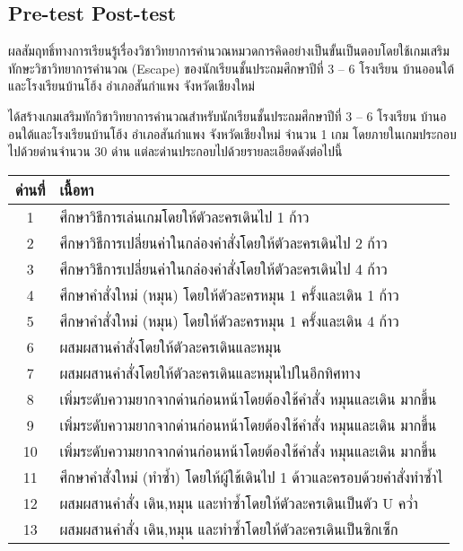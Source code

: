 \subsection{Pre-test Post-test}
ผลสัมฤทธิ์ทางการเรียนรู้เรื่องวิชาวิทยาการคำนวณหมวดการคิดอย่างเป็นขั้นเป็นตอบโดยใช้เกมเสริมทักษะวิชาวิทยาการคำนวณ (Escape) ของนักเรียนชั้นประถมศึกษาปีที่ 3 – 6
โรงเรียน บ้านออนใต้และโรงเรียนบ้านโฮ้ง อำเภอสันกำแพง จังหวัดเชียงใหม่\par
ได้สร้างเกมเสริมทักวิชาวิทยาการคำนวณสำหรับนักเรียนชั้นประถมศึกษาปีที่ 3 – 6 โรงเรียน
บ้านออนใต้และโรงเรียนบ้านโฮ้ง อำเภอสันกำแพง จังหวัดเชียงใหม่ จำนวน 1 เกม
โดยภายในเกมประกอบไปด้วยด่านจำนวน 30 ด่าน
แต่ละด่านประกอบไปด้วยรายละเอียดดังต่อไปนี้\par
{}
\begin{center}
    \begin{tabular}{|c | m{35em}|} 
     \hline
     ด่านที่ & เนื้อหา\\ [0.5ex] 
     \hline\hline
     1 &  ศึกษาวิธีการเล่นเกมโดยให้ตัวละครเดินไป 1 ก้าว \\ 
     \hline
     2 &  ศึกษาวิธีการเปลี่ยนค่าในกล่องคำสั่งโดยให้ตัวละครเดินไป 2 ก้าว \\ 
     \hline
     3 &  ศึกษาวิธีการเปลี่ยนค่าในกล่องคำสั่งโดยให้ตัวละครเดินไป 4 ก้าว \\ 
     \hline
     4 &  ศึกษาคำสั่งใหม่ (หมุน) โดยให้ตัวละครหมุน 1 ครั้งและเดิน 1 ก้าว \\ 
     \hline
     5 &  ศึกษาคำสั่งใหม่ (หมุน) โดยให้ตัวละครหมุน 1 ครั้งและเดิน 4 ก้าว \\ 
     \hline
     6 &  ผสมผสานคำสั่งโดยให้ตัวละครเดินและหมุน \\ 
     \hline
     7 &  ผสมผสานคำสั่งโดยให้ตัวละครเดินและหมุนไปในอีกทิศทาง \\ 
     \hline
     8 &  เพิ่มระดับความยากจากด่านก่อนหน้าโดยต้องใช้คำสั่ง หมุนและเดิน มากขึ้น \\ 
     \hline
     9 &  เพิ่มระดับความยากจากด่านก่อนหน้าโดยต้องใช้คำสั่ง หมุนและเดิน มากขึ้น \\ 
     \hline
     10 &  เพิ่มระดับความยากจากด่านก่อนหน้าโดยต้องใช้คำสั่ง หมุนและเดิน มากขึ้น \\ 
     \hline
     11 &  ศึกษาคำสั่งใหม่ (ทำซ้ำ) โดยให้ผู้ใช้เดินไป 1 ด้าวและครอบด้วยคำสั่งทำซ้ำไ \\ 
     \hline
     12 &  ผสมผสานคำสั่ง เดิน,หมุน และทำซ้ำโดยให้ตัวละครเดินเป็นตัว U คว่ำ \\ 
     \hline
     13 &  ผสมผสานคำสั่ง เดิน,หมุน และทำซ้ำโดยให้ตัวละครเดินเป็นซิกเซ็ก \\ 

\end{tabular}
\end{center}
